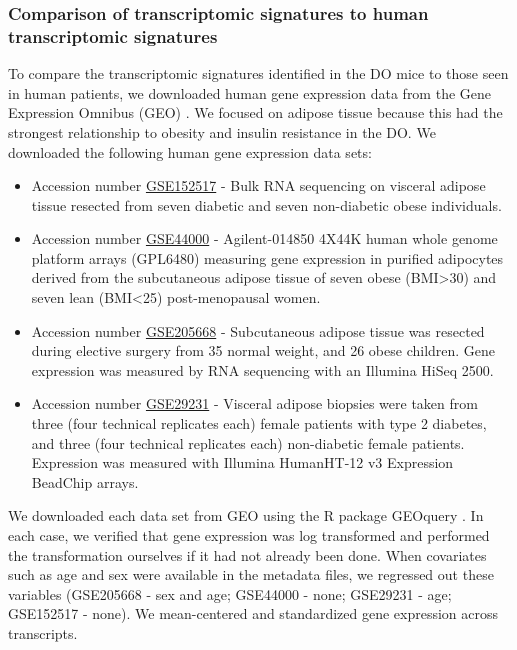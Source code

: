 \documentclass[
]{article}
\begin{document}
\subsubsection{Comparison of transcriptomic signatures to human
transcriptomic
signatures}\label{comparison-of-transcriptomic-signatures-to-human-transcriptomic-signatures}

To compare the transcriptomic signatures identified in the DO mice to
those seen in human patients, we downloaded human gene expression data
from the Gene Expression Omnibus (GEO)
\cite{pmid37933855, pmid11752295}. We focused on adipose tissue because
this had the strongest relationship to obesity and insulin resistance in
the DO. We downloaded the following human gene expression data sets:

\begin{itemize}
\item
  Accession number
  \href{https://www.ncbi.nlm.nih.gov/geo/query/acc.cgi?acc=GSE152517}{GSE152517}
  - Bulk RNA sequencing on visceral adipose tissue resected from seven
  diabetic and seven non-diabetic obese individuals.
\item
  Accession number
  \href{https://www.ncbi.nlm.nih.gov/geo/query/acc.cgi?acc=GSE44000}{GSE44000}
  - Agilent-014850 4X44K human whole genome platform arrays (GPL6480)
  measuring gene expression in purified adipocytes derived from the
  subcutaneous adipose tissue of seven obese (BMI\textgreater30) and
  seven lean (BMI\textless25) post-menopausal women.
\item
  Accession number
  \href{https://www.ncbi.nlm.nih.gov/geo/query/acc.cgi?acc=GSE205668}{GSE205668}
  - Subcutaneous adipose tissue was resected during elective surgery
  from 35 normal weight, and 26 obese children. Gene expression was
  measured by RNA sequencing with an Illumina HiSeq 2500.
\item
  Accession number
  \href{https://www.ncbi.nlm.nih.gov/geo/query/acc.cgi?acc=GSE29231}{GSE29231}
  - Visceral adipose biopsies were taken from three (four technical
  replicates each) female patients with type 2 diabetes, and three (four
  technical replicates each) non-diabetic female patients. Expression
  was measured with Illumina HumanHT-12 v3 Expression BeadChip arrays.
\end{itemize}

We downloaded each data set from GEO using the R package GEOquery
\cite{geoquery}. In each case, we verified that gene expression was log
transformed and performed the transformation ourselves if it had not
already been done. When covariates such as age and sex were available in
the metadata files, we regressed out these variables (GSE205668 - sex
and age; GSE44000 - none; GSE29231 - age; GSE152517 - none). We
mean-centered and standardized gene expression across transcripts.
\end{document}
